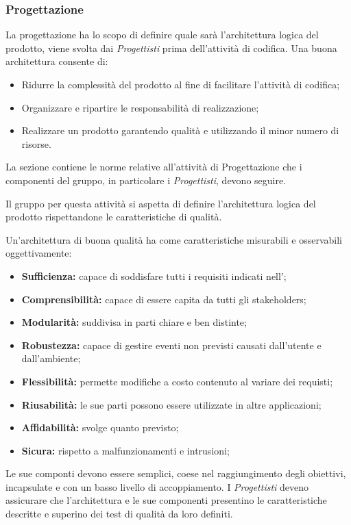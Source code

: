 \subsubsection{Progettazione}
La progettazione ha lo scopo di definire quale sarà l'architettura logica del prodotto, viene svolta dai \textit{Progettisti} prima dell'attività di codifica. Una buona architettura consente di:
\begin{itemize}
	\item Ridurre la complessità del prodotto al fine di facilitare l'attività di codifica;
	\item Organizzare e ripartire le responsabilità di realizzazione;
	\item Realizzare un prodotto garantendo qualità e utilizzando il minor numero di risorse.
\end{itemize} 

La sezione contiene le norme relative all'attività di Progettazione che i componenti del gruppo, in particolare i \textit{Progettisti}, devono seguire.

Il gruppo per questa attività si aspetta di definire l'architettura logica del prodotto rispettandone le caratteristiche di qualità.

Un'architettura di buona qualità ha come caratteristiche misurabili e osservabili oggettivamente:
\begin{itemize}
	\item \textbf{Sufficienza: }capace di soddisfare tutti i requisiti indicati nell'\AdRv;
	\item \textbf{Comprensibilità: }capace di essere capita da tutti gli stakeholders;
	\item \textbf{Modularità: }suddivisa in parti chiare e ben distinte;
	\item \textbf{Robustezza: }capace di gestire eventi non previsti causati dall'utente e dall'ambiente;
	\item \textbf{Flessibilità: }permette modifiche a costo contenuto al variare dei requisti;
	\item \textbf{Riusabilità: }le sue parti possono essere utilizzate in altre applicazioni;
	\item \textbf{Affidabilità: }svolge quanto previsto;
	\item \textbf{Sicura: }rispetto a malfunzionamenti e intrusioni;
\end{itemize}
Le sue componti devono essere semplici, coese nel raggiungimento degli obiettivi, incapsulate e con un basso livello di accoppiamento.
I \textit{Progettisti} deveno assicurare che l'architettura e le sue componenti presentino le caratteristiche descritte e superino dei test di qualità da loro definiti.

